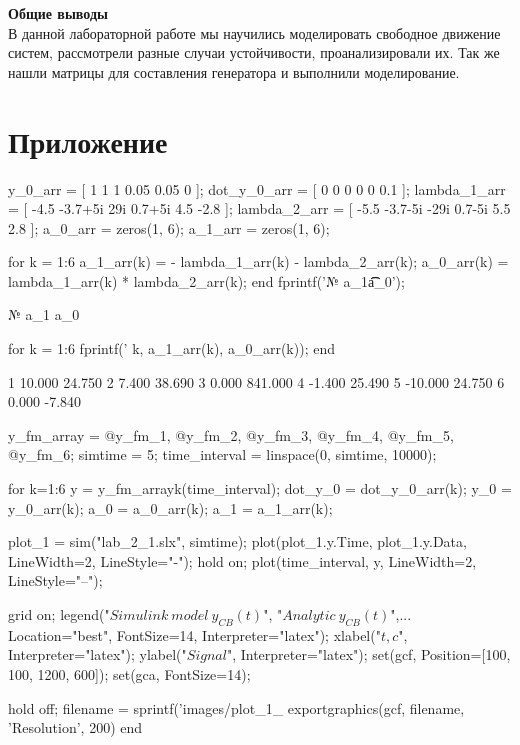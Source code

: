 \textbf{Общие выводы}\\
В данной лабораторной работе мы научились моделировать свободное движение систем,
рассмотрели разные случаи устойчивости, проанализировали их. Так же нашли матрицы для составления генератора и
выполнили моделирование.


\section{Приложение}

\begin{matlabcode}
y_0_arr = [ 1 1 1 0.05 0.05 0 ];
dot_y_0_arr = [ 0 0 0 0 0 0.1 ];
lambda_1_arr = [ -4.5 -3.7+5i 29i 0.7+5i 4.5 -2.8 ];
lambda_2_arr = [ -5.5 -3.7-5i -29i 0.7-5i 5.5 2.8 ];
a_0_arr = zeros(1, 6);
a_1_arr = zeros(1, 6);

for k = 1:6
    a_1_arr(k) = - lambda_1_arr(k) - lambda_2_arr(k);
    a_0_arr(k) = lambda_1_arr(k) * lambda_2_arr(k);
end
fprintf('№  a_1\t\t a_0\n');
\end{matlabcode}
\begin{matlaboutput}
№  a_1		 a_0
\end{matlaboutput}
\begin{matlabcode}
for k = 1:6
    fprintf('%
        k, a_1_arr(k), a_0_arr(k));
end
\end{matlabcode}
\begin{matlaboutput}
1  10.000	 24.750
2   7.400	 38.690
3   0.000	841.000
4  -1.400	 25.490
5 -10.000	 24.750
6   0.000	 -7.840
\end{matlaboutput}


\begin{matlabcode}
y_fm_array = {@y_fm_1, @y_fm_2, @y_fm_3, @y_fm_4, @y_fm_5, @y_fm_6};
simtime = 5;
time_interval = linspace(0, simtime, 10000);

for k=1:6
    y = y_fm_array{k}(time_interval);
    dot_y_0 = dot_y_0_arr(k);
    y_0 = y_0_arr(k);
    a_0 = a_0_arr(k);
    a_1 = a_1_arr(k);

    plot_1 = sim("lab_2_1.slx", simtime);
    plot(plot_1.y.Time, plot_1.y.Data, LineWidth=2, LineStyle="-");
    hold on;
    plot(time_interval, y, LineWidth=2, LineStyle="--");
    
    grid on;
    legend("$Simulink\ model\ y_{CB}(t)$", "$Analytic\ y_{CB}(t)$",...
        Location="best", FontSize=14, Interpreter="latex");
    xlabel("$t, c$", Interpreter="latex");
    ylabel("$Signal$", Interpreter="latex");
    set(gcf, Position=[100, 100, 1200, 600]);   
    set(gca, FontSize=14);
    
    hold off;
    filename = sprintf('images/plot_1_%
    exportgraphics(gcf, filename, 'Resolution', 200)
end
\end{matlabcode}

